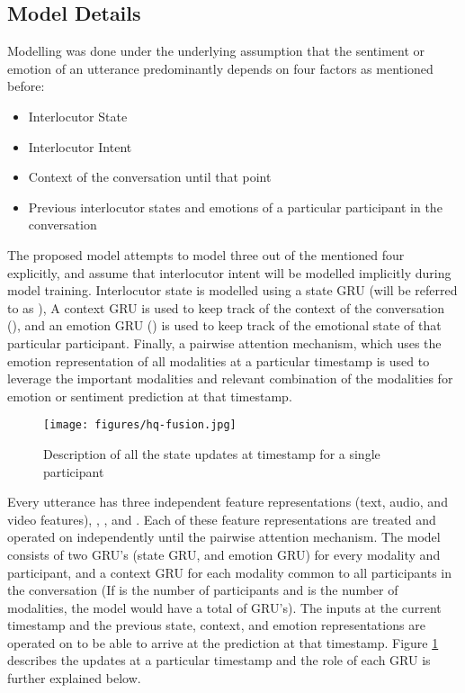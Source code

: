 \documentclass[11pt,a4paper]{article}
\begin{document}
\subsection{Model Details}

Modelling was done under the underlying assumption that the sentiment or emotion of an utterance predominantly depends on four factors as mentioned before:
\begin{itemize}
    \item{Interlocutor State}
    \item{Interlocutor Intent}
    \item{Context of the conversation until that point}
    \item{Previous interlocutor states and emotions of a particular participant in the conversation}
\end{itemize}

The proposed model attempts to model three out of the mentioned four explicitly, and assume that interlocutor intent will be modelled implicitly during model training. Interlocutor state is modelled using a state GRU (will be referred to as ), A context GRU is used to keep track of the context of the conversation (), and an emotion GRU () is used to keep track of the emotional state of that particular participant. Finally, a pairwise attention mechanism, which uses the emotion representation of all modalities at a particular timestamp is used to leverage the important modalities and relevant combination of the modalities for emotion or sentiment prediction at that timestamp.

\begin{figure}[htbp]
	\centering
		\texttt{[image: figures/hq-fusion.jpg]}    
    \caption[monologue]{Description of all the state updates at timestamp  for a single participant }
	\label{fig:monologue}
\end{figure}

Every utterance has three independent feature representations (text, audio, and video features),  , , and . Each of these feature representations are treated and operated on independently until the pairwise attention mechanism. The model consists of two GRU’s (state GRU, and emotion GRU) for every modality and participant, and a context GRU for each modality common to all participants in the conversation (If  is the number of participants and  is the number of modalities, the model would have a total of  GRU’s). The inputs at the current timestamp and the previous state, context, and emotion representations are operated on to be able to arrive at the prediction at that timestamp. Figure \ref{fig:monologue} describes the updates at a particular timestamp and the role of each GRU is further explained below.
\end{document}
